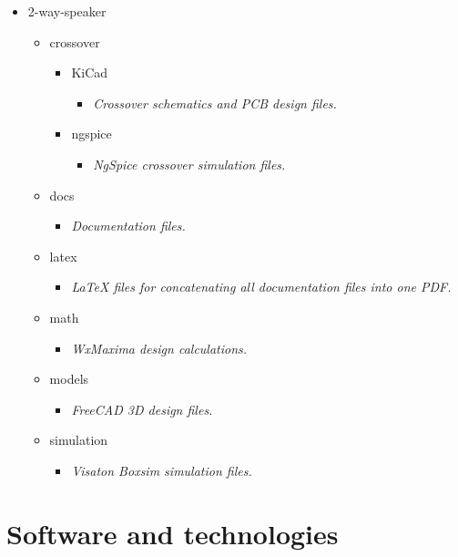 \documentclass[10pt]{article}
\begin{document}
\begin{itemize}
\item 2-way-speaker
    \begin{itemize}
    \item crossover
        \begin{itemize}
        \item KiCad
            \begin{itemize}
            \item \textit{Crossover schematics and PCB design files.}
            \end{itemize}
        \item ngspice
            \begin{itemize}
            \item \textit{NgSpice crossover simulation files.}
            \end{itemize}
        \end{itemize}
    \item docs
        \begin{itemize}
        \item \textit{Documentation files.}
        \end{itemize}
    \item latex
        \begin{itemize}
        \item \textit{LaTeX files for concatenating all documentation files into one PDF.}
        \end{itemize}
    \item math
        \begin{itemize}
        \item \textit{WxMaxima design calculations.}
        \end{itemize}
    \item models
        \begin{itemize}
        \item \textit{FreeCAD 3D design files.}
        \end{itemize}
    \item simulation
        \begin{itemize}
        \item \textit{Visaton Boxsim simulation files.}
        \end{itemize}
    \end{itemize}
\end{itemize}

\section{Software and technologies}
\end{document}
